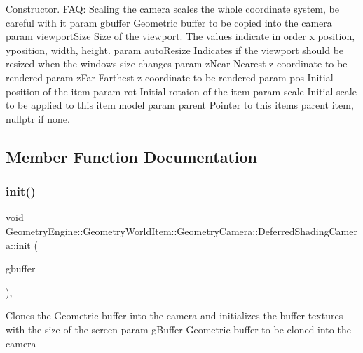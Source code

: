 Constructor. F\+AQ\+: Scaling the camera scales the whole coordinate system, be careful with it param gbuffer Geometric buffer to be copied into the camera param viewport\+Size Size of the viewport. The values indicate in order x position, yposition, width, height. param auto\+Resize Indicates if the viewport should be resized when the window\textquotesingle{}s size changes param z\+Near Nearest z coordinate to be rendered param z\+Far Farthest z coordinate to be rendered param pos Initial position of the item param rot Initial rotaion of the item param scale Initial scale to be applied to this item model param parent Pointer to this items parent item, nullptr if none. 

\subsection{Member Function Documentation}
\mbox{\label{class_geometry_engine_1_1_geometry_world_item_1_1_geometry_camera_1_1_deferred_shading_camera_a36c689377af8038020678a37535870c8}} 
\subsubsection{\texorpdfstring{init()}{init()}}
{\footnotesize\ttfamily void Geometry\+Engine\+::\+Geometry\+World\+Item\+::\+Geometry\+Camera\+::\+Deferred\+Shading\+Camera\+::init (\begin{DoxyParamCaption}\item[{const \mbox{\hyperlink{class_geometry_engine_1_1_geometry_buffer_1_1_g_buffer}{Geometry\+Buffer\+::\+G\+Buffer}} \&}]{gbuffer }\end{DoxyParamCaption})\hspace{0.3cm}{\ttfamily [protected]}, {\ttfamily [virtual]}}

Clones the Geometric buffer into the camera and initializes the buffer textures with the size of the screen param g\+Buffer Geometric buffer to be cloned into the camera \mbox{\label{class_geometry_engine_1_1_geometry_world_item_1_1_geometry_camera_1_1_deferred_shading_camera_a33cb7d45b61f5d4414951bafb3f6a342}} 
